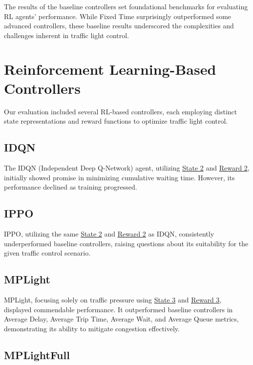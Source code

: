 The results of the baseline controllers set foundational benchmarks for evaluating RL agents' performance. While Fixed Time surprisingly outperformed some advanced controllers, these baseline results underscored the complexities and challenges inherent in traffic light control.

\section{Reinforcement Learning-Based Controllers}

Our evaluation included several RL-based controllers, each employing distinct state representations and reward functions to optimize traffic light control.

\subsection{IDQN}

The IDQN (Independent Deep Q-Network) agent, utilizing \hyperref[subsec:state-2]{State 2} and \hyperref[subsec:reward-2]{Reward 2}, initially showed promise in minimizing cumulative waiting time. However, its performance declined as training progressed.

\subsection{IPPO}

IPPO, utilizing the same \hyperref[subsec:state-2]{State 2} and \hyperref[subsec:reward-2]{Reward 2} as IDQN, consistently underperformed baseline controllers, raising questions about its suitability for the given traffic control scenario.

\subsection{MPLight}

MPLight, focusing solely on traffic pressure using \hyperref[subsec:state-3]{State 3} and \hyperref[subsec:reward-3]{Reward 3}, displayed commendable performance. It outperformed baseline controllers in Average Delay, Average Trip Time, Average Wait, and Average Queue metrics, demonstrating its ability to mitigate congestion effectively.

\subsection{MPLightFull}

